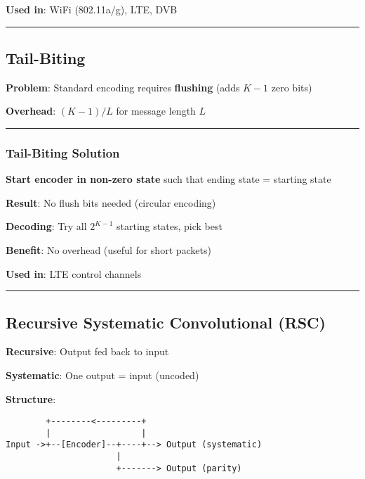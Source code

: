 \textbf{Used in}: WiFi (802.11a/g), LTE, DVB

\begin{center}\rule{0.5\linewidth}{0.5pt}\end{center}

\subsection{Tail-Biting}\label{tail-biting}

\textbf{Problem}: Standard encoding requires \textbf{flushing} (adds
\(K-1\) zero bits)

\textbf{Overhead}: \((K-1)/L\) for message length \(L\)

\begin{center}\rule{0.5\linewidth}{0.5pt}\end{center}

\subsubsection{Tail-Biting Solution}\label{tail-biting-solution}

\textbf{Start encoder in non-zero state} such that ending state =
starting state

\textbf{Result}: No flush bits needed (circular encoding)

\textbf{Decoding}: Try all \(2^{K-1}\) starting states, pick best

\textbf{Benefit}: No overhead (useful for short packets)

\textbf{Used in}: LTE control channels

\begin{center}\rule{0.5\linewidth}{0.5pt}\end{center}

\subsection{Recursive Systematic Convolutional
(RSC)}\label{recursive-systematic-convolutional-rsc}

\textbf{Recursive}: Output fed back to input

\textbf{Systematic}: One output = input (uncoded)

\textbf{Structure}:

\begin{verbatim}
        +--------<---------+
        |                  |
Input ->+--[Encoder]--+----+--> Output (systematic)
                      |
                      +-------> Output (parity)
\end{verbatim}

